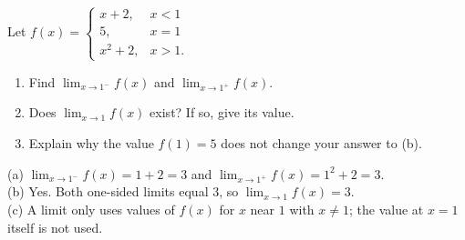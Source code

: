 \begin{exo}{}
Let $f(x)=\begin{cases}x+2, & x<1\\ 5, & x=1\\ x^2+2, & x>1.\end{cases}$
\begin{enumerate}[label=(\alph*)]
\item Find $\displaystyle\lim_{x\to1^-}f(x)$ and $\displaystyle\lim_{x\to1^+}f(x)$.
\item Does $\displaystyle\lim_{x\to1}f(x)$ exist? If so, give its value.
\item Explain why the value $f(1)=5$ does not change your answer to (b).
\end{enumerate}
\begin{solution}
(a) $\lim_{x\to1^-}f(x)=1+2=3$ and $\lim_{x\to1^+}f(x)=1^2+2=3$.\\
(b) Yes. Both one-sided limits equal $3$, so $\lim_{x\to1}f(x)=3$.\\
(c) A limit only uses values of $f(x)$ for $x$ near $1$ with $x\neq1$; the value at $x=1$ itself is not used.
\end{solution}
\end{exo}

